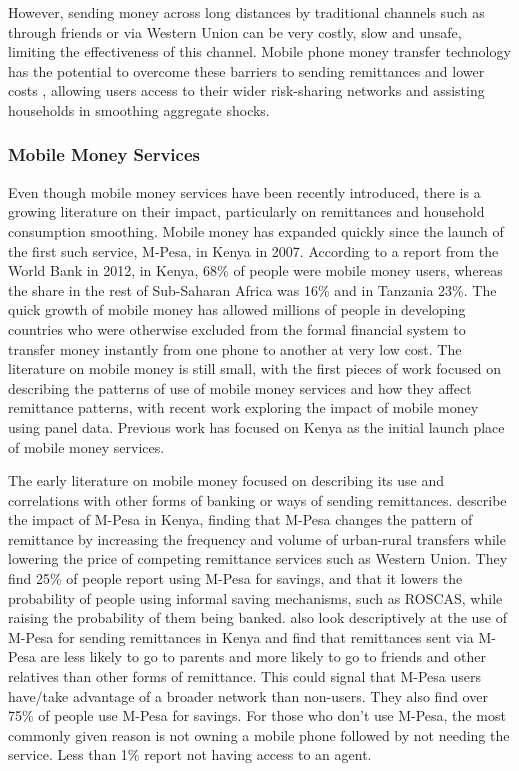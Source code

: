 However, sending money across long distances by traditional channels such as through friends or via Western Union can be very costly, slow and unsafe, limiting the effectiveness of this channel. Mobile phone money transfer technology has the potential to overcome these barriers to sending remittances and lower costs \citep{JackSuri2014}, allowing users access to their wider risk-sharing networks and assisting households in smoothing aggregate shocks. 

\subsubsection{Mobile Money Services}
Even though mobile money services have been recently introduced, there is a growing literature on their impact, particularly on remittances and household consumption smoothing. Mobile money has expanded quickly since the launch of the first such service, M-Pesa, in Kenya in 2007. According to a report from the World Bank in 2012\nocite{WBfinancialinclusion}, in Kenya, 68\% of people were mobile money users, whereas the share in the rest of Sub-Saharan Africa was 16\% and in Tanzania 23\%. The quick growth of mobile money has allowed millions of people in developing countries who were otherwise excluded from the formal financial system to transfer money instantly from one phone to another at very low cost. The literature on mobile money is still small, with the first pieces of work focused on describing the patterns of use of mobile money services and how they affect remittance patterns, with recent work exploring the impact of mobile money using panel data. Previous work has focused on Kenya as the initial launch place of mobile money services. 

The early literature on mobile money focused on describing its use and correlations with other forms of banking or ways of sending remittances. \cite{MbitiWeil2011} describe the impact of M-Pesa in Kenya, finding that M-Pesa changes the pattern of remittance by increasing the frequency and volume of urban-rural transfers while lowering the price of competing remittance services such as Western Union. They  find 25\% of people report using M-Pesa for savings, and that it lowers the probability of people using informal saving mechanisms, such as ROSCAS, while raising the probability of them being banked. \cite{JackSuri2011} also look descriptively at the use of M-Pesa for sending remittances in Kenya and find that remittances sent via M-Pesa are less likely to go to parents and more likely to go to friends and other relatives  than other forms of remittance. This could signal that M-Pesa users have/take advantage of a broader network than non-users. They also find over 75\% of people use M-Pesa for savings. For those who don't use M-Pesa, the most commonly given reason is not owning a mobile phone followed by not needing the service. Less than 1\% report not having access to an agent. 

